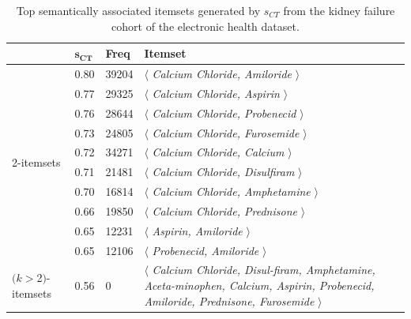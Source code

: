 \begin{table}
\begin{center}
\begin{tabular}{l|l |l |l }
  \hline
&$\mathbf{s_{CT}}$      &\textbf{Freq}&   \textbf{Itemset}\\
  \hline\hline
\multirow{10}{*}{2-itemsets}& 0.80	&	39204		&$\langle$\emph{	Calcium Chloride,	Amiloride	}$\rangle$\\
&0.77	&	29325		&$\langle$\emph{	Calcium Chloride,	Aspirin	}$\rangle$\\
&0.76	&	28644		&$\langle$\emph{	Calcium Chloride,	Probenecid	}$\rangle$\\
&0.73	&	24805		&$\langle$\emph{	Calcium Chloride,	Furosemide	}$\rangle$\\
&0.72	&	34271		&$\langle$\emph{	Calcium Chloride,	Calcium	}$\rangle$\\
&0.71	&	21481		&$\langle$\emph{	Calcium Chloride,	Disulfiram	}$\rangle$\\
&0.70	&	16814		&$\langle$\emph{	Calcium Chloride,	Amphetamine	}$\rangle$\\
&0.66	&	19850		&$\langle$\emph{	Calcium Chloride,	Prednisone	}$\rangle$\\
&0.65	&	12231		&$\langle$\emph{	Aspirin,	Amiloride	}$\rangle$\\
&0.65	&	12106		&$\langle$\emph{	Probenecid,	Amiloride	}$\rangle$\\
  \hline
\parbox{1cm}{$(k$$>$2$)$-itemsets}&0.56	&	0	&	\parbox{6cm}{$\langle$\emph{	Calcium Chloride, Disul-firam, Amphetamine, Aceta-minophen, Calcium, Aspirin, Probenecid, Amiloride, Prednisone, Furosemide	}$\rangle$}\\
\hline
\end{tabular}
\end{center}
\caption{\label{tbl:ncbo_ct} Top semantically associated itemsets generated by $s_{CT}$ from the kidney failure cohort of the electronic health dataset.}
\end{table}


